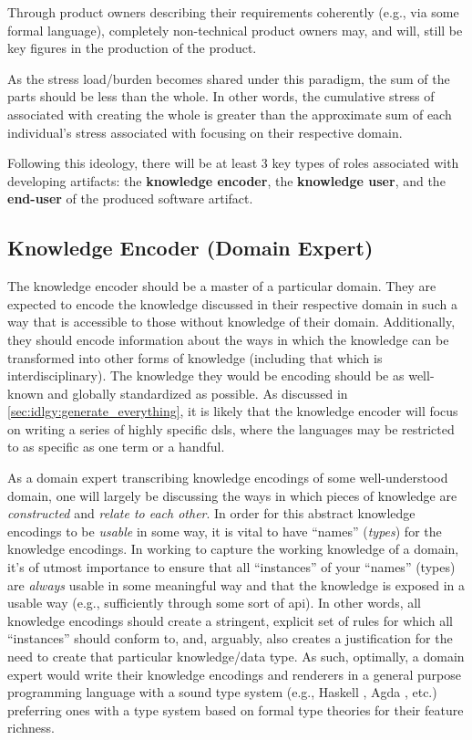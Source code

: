 Through product owners describing their requirements coherently (e.g., via some
formal language), completely non-technical product owners may, and will, still
be key figures in the production of the product.

As the stress load/burden becomes shared under this paradigm, the sum of the
parts should be less than the whole. In other words, the cumulative stress of
associated with creating the whole is greater than the approximate sum of each
individual's stress associated with focusing on their respective domain.

Following this ideology, there will be at least 3 key types of roles associated
with developing artifacts: the \textbf{knowledge encoder}, the \textbf{knowledge
    user}, and the \textbf{end-user} of the produced software artifact.

\subsection{Knowledge Encoder (Domain Expert)}

The knowledge encoder should be a master of a particular domain. They are
expected to encode the knowledge discussed in their respective domain in such a
way that is accessible to those without knowledge of their domain. Additionally,
they should encode information about the ways in which the knowledge can be
transformed into other forms of knowledge (including that which is
interdisciplinary). The knowledge they would be encoding should be as well-known
and globally standardized as possible. As discussed in
\autoref{sec:idlgy:generate_everything}, it is likely that the knowledge encoder
will focus on writing a series of highly specific \aclp{dsl}, where the
languages may be restricted to as specific as one term or a handful.

As a domain expert transcribing knowledge encodings of some well-understood
domain, one will largely be discussing the ways in which pieces of knowledge are
\textit{constructed} and \textit{relate to each other}. In order for this
abstract knowledge encodings to be \textit{usable} in some way, it is vital to
have ``names'' (\textit{types}) for the knowledge encodings. In working to
capture the working knowledge of a domain, it's of utmost importance to ensure
that all ``instances'' of your ``names'' (types) are \textit{always} usable in
some meaningful way and that the knowledge is exposed in a usable way (e.g.,
sufficiently through some sort of \acs{api}). In other words, all knowledge
encodings should create a stringent, explicit set of rules for which all
``instances'' should conform to, and, arguably, also creates a justification for
the need to create that particular knowledge/data type. As such, optimally, a
domain expert would write their knowledge encodings and renderers in a general
purpose programming language with a sound type system (e.g., Haskell
\cite{Haskell2010}, Agda \cite{Norell2007}, etc.) \textemdash{} preferring ones
with a type system based on formal type theories for their feature richness.

